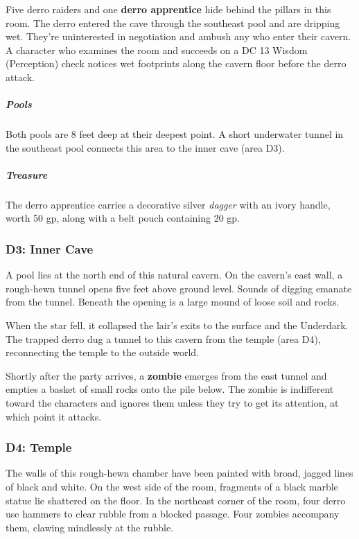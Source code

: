 \documentclass[10pt,a4paper,twoside,bg=print,twocolumn,openany,nodeprecatedcode]{dndbook}
\begin{document}
Five derro raiders and one \textbf{derro apprentice} hide behind the pillars in this room. The derro entered the cave through the southeast pool and are dripping wet. They're uninterested in negotiation and ambush any who enter their cavern. A character who examines the room and succeeds on a DC 13 Wisdom (Perception) check notices wet footprints along the cavern floor before the derro attack.

\subparagraph{Pools}
Both pools are 8 feet deep at their deepest point. A short underwater tunnel in the southeast pool connects this area to the inner cave (area D3).

\subparagraph{Treasure}
The derro apprentice carries a decorative silver \textit{dagger} with an ivory handle, worth 50 gp, along with a belt pouch containing 20 gp.

\subsubsection{D3: Inner Cave}
\begin{DndReadAloud}{}
A pool lies at the north end of this natural cavern. On the cavern's east wall, a rough-hewn tunnel opens five feet above ground level. Sounds of digging emanate from the tunnel. Beneath the opening is a large mound of loose soil and rocks.

\end{DndReadAloud}

When the star fell, it collapsed the lair's exits to the surface and the Underdark. The trapped derro dug a tunnel to this cavern from the temple (area D4), reconnecting the temple to the outside world.

Shortly after the party arrives, a \textbf{zombie} emerges from the east tunnel and empties a basket of small rocks onto the pile below. The zombie is indifferent toward the characters and ignores them unless they try to get its attention, at which point it attacks.

\subsubsection{D4: Temple}
\begin{DndReadAloud}{}
The walls of this rough-hewn chamber have been painted with broad, jagged lines of black and white. On the west side of the room, fragments of a black marble statue lie shattered on the floor. In the northeast corner of the room, four derro use hammers to clear rubble from a blocked passage. Four zombies accompany them, clawing mindlessly at the rubble.

\end{DndReadAloud}
\end{document}
